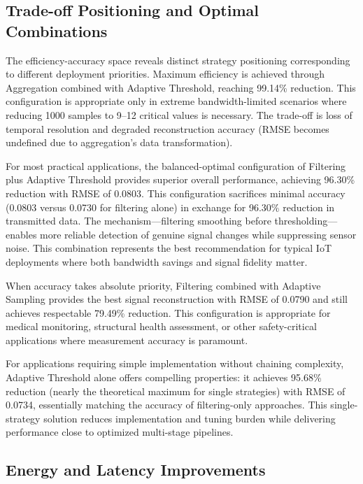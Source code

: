 \documentclass[10pt,twocolumn]{article}
\begin{document}
\vspace{0.15cm}

\subsection{Trade-off Positioning and Optimal Combinations}

The efficiency-accuracy space reveals distinct strategy positioning corresponding to different deployment priorities. Maximum efficiency is achieved through Aggregation combined with Adaptive Threshold, reaching 99.14\% reduction. This configuration is appropriate only in extreme bandwidth-limited scenarios where reducing 1000 samples to 9--12 critical values is necessary. The trade-off is loss of temporal resolution and degraded reconstruction accuracy (RMSE becomes undefined due to aggregation's data transformation).

For most practical applications, the balanced-optimal configuration of Filtering plus Adaptive Threshold provides superior overall performance, achieving 96.30\% reduction with RMSE of 0.0803. This configuration sacrifices minimal accuracy (0.0803 versus 0.0730 for filtering alone) in exchange for 96.30\% reduction in transmitted data. The mechanism---filtering smoothing before thresholding---enables more reliable detection of genuine signal changes while suppressing sensor noise. This combination represents the best recommendation for typical IoT deployments where both bandwidth savings and signal fidelity matter.

When accuracy takes absolute priority, Filtering combined with Adaptive Sampling provides the best signal reconstruction with RMSE of 0.0790 and still achieves respectable 79.49\% reduction. This configuration is appropriate for medical monitoring, structural health assessment, or other safety-critical applications where measurement accuracy is paramount.

For applications requiring simple implementation without chaining complexity, Adaptive Threshold alone offers compelling properties: it achieves 95.68\% reduction (nearly the theoretical maximum for single strategies) with RMSE of 0.0734, essentially matching the accuracy of filtering-only approaches. This single-strategy solution reduces implementation and tuning burden while delivering performance close to optimized multi-stage pipelines.

\subsection{Energy and Latency Improvements}
\end{document}
